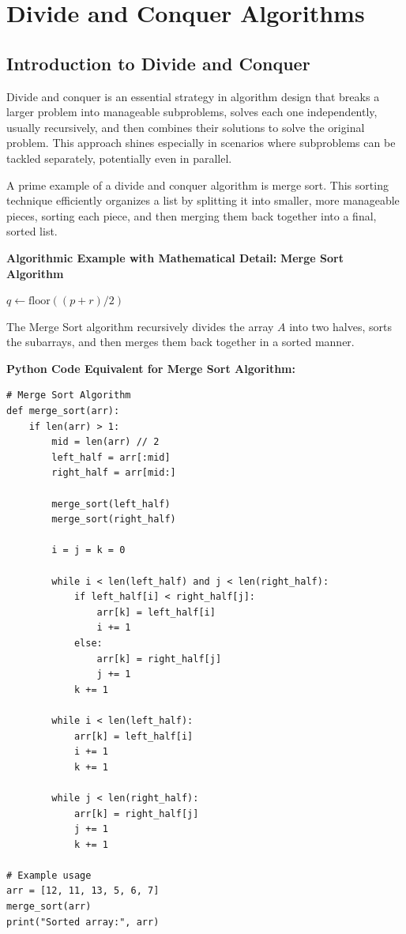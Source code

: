 \documentclass[12pt]{book} %
\begin{document}
\chapter{Divide and Conquer Algorithms}

\section{Introduction to Divide and Conquer}
Divide and conquer is an essential strategy in algorithm design that breaks a larger problem into manageable subproblems, solves each one independently, usually recursively, and then combines their solutions to solve the original problem. This approach shines especially in scenarios where subproblems can be tackled separately, potentially even in parallel.

A prime example of a divide and conquer algorithm is merge sort. This sorting technique efficiently organizes a list by splitting it into smaller, more manageable pieces, sorting each piece, and then merging them back together into a final, sorted list.


\textbf{Algorithmic Example with Mathematical Detail:}
\FloatBarrier
\textbf{Merge Sort Algorithm}
\FloatBarrier
\begin{algorithm}
\caption{Merge Sort}\label{merge_sort}
\begin{algorithmic}[1]
        \State $q \gets \text{floor}((p+r)/2)$
        \State {}
        \State {}
        \State {}
    \EndIf
\EndFunction
\end{algorithmic}
\end{algorithm}
\FloatBarrier
The Merge Sort algorithm recursively divides the array $A$ into two halves, sorts the subarrays, and then merges them back together in a sorted manner.

\textbf{Python Code Equivalent for Merge Sort Algorithm:}
\FloatBarrier
\begin{lstlisting}
# Merge Sort Algorithm
def merge_sort(arr):
    if len(arr) > 1:
        mid = len(arr) // 2
        left_half = arr[:mid]
        right_half = arr[mid:]

        merge_sort(left_half)
        merge_sort(right_half)

        i = j = k = 0

        while i < len(left_half) and j < len(right_half):
            if left_half[i] < right_half[j]:
                arr[k] = left_half[i]
                i += 1
            else:
                arr[k] = right_half[j]
                j += 1
            k += 1

        while i < len(left_half):
            arr[k] = left_half[i]
            i += 1
            k += 1

        while j < len(right_half):
            arr[k] = right_half[j]
            j += 1
            k += 1

# Example usage
arr = [12, 11, 13, 5, 6, 7]
merge_sort(arr)
print("Sorted array:", arr)
\end{lstlisting}
\FloatBarrier
\end{document}
